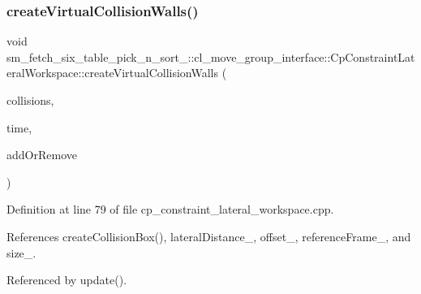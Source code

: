 \subsubsection{\texorpdfstring{create\+Virtual\+Collision\+Walls()}{createVirtualCollisionWalls()}}
{\footnotesize\ttfamily void sm\+\_\+fetch\+\_\+six\+\_\+table\+\_\+pick\+\_\+n\+\_\+sort\+\_\+::cl\+\_\+move\+\_\+group\+\_\+interface\+::\+Cp\+Constraint\+Lateral\+Workspace\+::create\+Virtual\+Collision\+Walls (\begin{DoxyParamCaption}\item[{std\+::vector$<$ moveit\+\_\+msgs\+::\+Collision\+Object $>$ \&}]{collisions,  }\item[{const ros\+::\+Time \&}]{time,  }\item[{int}]{add\+Or\+Remove }\end{DoxyParamCaption})}



Definition at line 79 of file cp\+\_\+constraint\+\_\+lateral\+\_\+workspace.\+cpp.



References create\+Collision\+Box(), lateral\+Distance\+\_\+, offset\+\_\+, reference\+Frame\+\_\+, and size\+\_\+.



Referenced by update().


